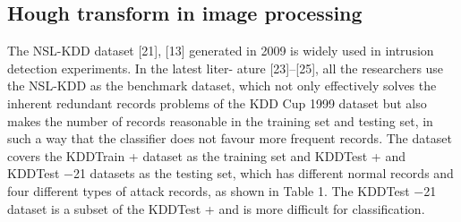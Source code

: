 \documentclass[12pt]{report}	%
\begin{document}
\newpage

\subsection{Hough transform in image processing}
The NSL-KDD dataset [21], [13] generated in 2009 is widely
used in intrusion detection experiments. In the latest liter-
ature [23]–[25], all the researchers use the NSL-KDD as
the benchmark dataset, which not only effectively solves
the inherent redundant records problems of the KDD Cup
1999 dataset but also makes the number of records reasonable
in the training set and testing set, in such a way that the classifier does not favour more frequent records. The dataset covers
the KDDTrain + dataset as the training set and KDDTest + and
KDDTest −21 datasets as the testing set, which has different normal records and four different types of attack records,
as shown in Table 1. The KDDTest −21 dataset is a subset of
the KDDTest + and is more difficult for classification.
\end{document}
